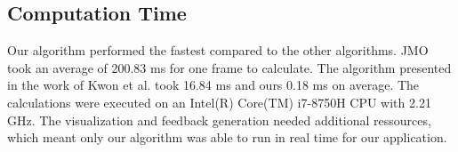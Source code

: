 \begin{table}
	\begin{center}
		\caption{\label{tab:comparison}Results of user study. Distribution of how often different viewpoint selection methods have been chosen by the participants.}
	\end{center}
\end{table}

\subsection{Computation Time}
Our algorithm performed the fastest compared to the other algorithms. JMO took an average of 200.83 ms for one frame to calculate. The algorithm presented in the work of Kwon et al. took 16.84 ms and ours 0.18 ms on average. The calculations were executed on an Intel(R) Core(TM) i7-8750H CPU with 2.21 GHz. The visualization and feedback generation needed additional ressources, which meant only our algorithm was able to run in real time for our application.

